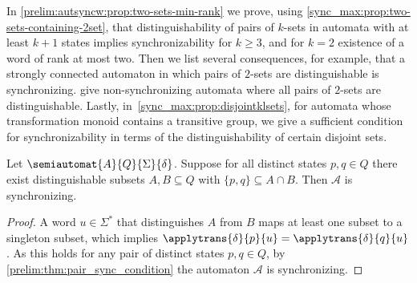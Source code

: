 
In \cref{prelim:autsyncw:prop:two-sets-min-rank}
we prove, using \cref{sync_max:prop:two-sets-containing-2set},
that distinguishability of pairs of $k$-sets in automata with at least $k+1$ states 
implies synchronizability for $k \ge 3$, and for $k = 2$
existence of a word of rank at most two.
Then we list several consequences, for example,
that a strongly connected automaton in which pairs of $2$-sets
are distinguishable is synchronizing.
give non-synchronizing automata where all pairs of $2$-sets
are distinguishable. Lastly, in~\cref{sync_max:prop:disjointklsets}, 
for automata whose transformation monoid contains a transitive group,
we give a sufficient condition for synchronizability in terms 
of the distinguishability of certain disjoint sets.

\begin{lemma}
	\label{sync_max:prop:two-sets-containing-2set}
	Let $\semiautomat{A}{Q}{\Sigma}{\delta}$.
	Suppose for all distinct states $p, q \in Q$
	there exist distinguishable subsets $A, B \subseteq Q$
	with $\{p,q\} \subseteq A \cap B$.
	Then $\mathcal A$ is synchronizing.	
\end{lemma}
\begin{proof}
	A word $u \in \Sigma^*$ that distinguishes $A$ from $B$
	maps at least one subset to a singleton subset,
	which implies $\applytrans{\delta}{p}{u} = \applytrans{\delta}{q}{u}$.
	As this holds for any pair of distinct states $p,q \in Q$, by \cref{prelim:thm:pair_sync_condition} 
	the automaton $\mathcal A$ is synchronizing.    			
\end{proof}

